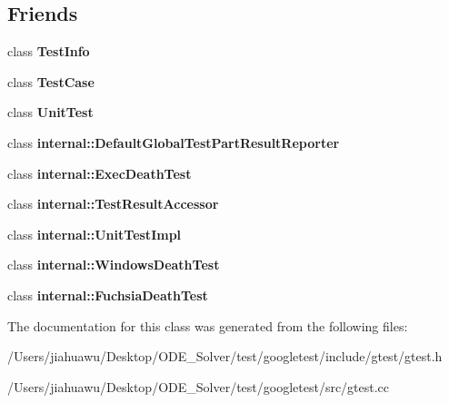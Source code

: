 \subsection*{Friends}
\begin{DoxyCompactItemize}
\item 
\mbox{\label{classtesting_1_1_test_result_a4c49c2cdb6c328e6b709b4542f23de3c}} 
class {\bfseries Test\+Info}
\item 
\mbox{\label{classtesting_1_1_test_result_aff779e55b06adfa7c0088bd10253f0f0}} 
class {\bfseries Test\+Case}
\item 
\mbox{\label{classtesting_1_1_test_result_a832b4d233efee1a32feb0f4190b30d39}} 
class {\bfseries Unit\+Test}
\item 
\mbox{\label{classtesting_1_1_test_result_abae39633da9932847b41cb80efd62115}} 
class {\bfseries internal\+::\+Default\+Global\+Test\+Part\+Result\+Reporter}
\item 
\mbox{\label{classtesting_1_1_test_result_adf5553cae6aea6f8648d47e299237e34}} 
class {\bfseries internal\+::\+Exec\+Death\+Test}
\item 
\mbox{\label{classtesting_1_1_test_result_ae762da04e74a0d3b0daded3c5bd4a8e8}} 
class {\bfseries internal\+::\+Test\+Result\+Accessor}
\item 
\mbox{\label{classtesting_1_1_test_result_acc0a5e7573fd6ae7ad1878613bb86853}} 
class {\bfseries internal\+::\+Unit\+Test\+Impl}
\item 
\mbox{\label{classtesting_1_1_test_result_a6aeedc04a0590fcc1b3c5f687dbb0f9f}} 
class {\bfseries internal\+::\+Windows\+Death\+Test}
\item 
\mbox{\label{classtesting_1_1_test_result_af29d5921f68031cdfba0b28cf4b3b559}} 
class {\bfseries internal\+::\+Fuchsia\+Death\+Test}
\end{DoxyCompactItemize}


The documentation for this class was generated from the following files\+:\begin{DoxyCompactItemize}
\item 
/\+Users/jiahuawu/\+Desktop/\+O\+D\+E\+\_\+\+Solver/test/googletest/include/gtest/gtest.\+h\item 
/\+Users/jiahuawu/\+Desktop/\+O\+D\+E\+\_\+\+Solver/test/googletest/src/gtest.\+cc\end{DoxyCompactItemize}
